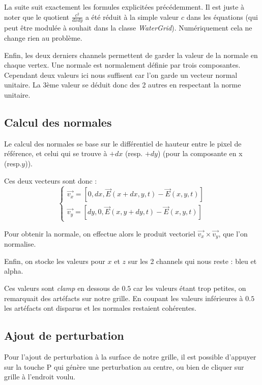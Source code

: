\documentclass[a4paper,11pt,leqno]{article}
\begin{document}
La suite suit exactement les formules explicitées précédemment. Il est juste à noter que le quotient $\frac{c^2}{dx dy}$ a été réduit à la simple valeur $c$ dans les équations (qui peut être modulée à souhait dans la classe \emph{WaterGrid}). Numériquement cela ne change rien au problème.

Enfin, les deux derniers channels permettent de garder la valeur de la normale en chaque vertex. Une normale est normalement définie par trois composantes. Cependant deux valeurs ici nous suffisent car l'on garde un vecteur normal unitaire. La 3ème valeur se déduit donc des 2 autres en respectant la norme unitaire.

\subsection{Calcul des normales}

Le calcul des normales se base sur le différentiel de hauteur entre le pixel de référence, et celui qui se trouve à $+dx$ (resp. $+dy$) (pour la composante en x (resp.$y$)).

Ces deux vecteurs sont donc :
\[
\begin{cases}
\overrightarrow{v_x} = [0, dx, \overrightarrow{E}(x + dx,y,t) - \overrightarrow{E}(x,y,t)] \\
\overrightarrow{v_y} = [dy, 0, \overrightarrow{E}(x,y + dy,t) - \overrightarrow{E}(x,y,t)]
\end{cases}
\]

Pour obtenir la normale, on effectue alors le produit vectoriel $\overrightarrow{v_x} \times \overrightarrow{v_y}$, que l'on normalise.

Enfin, on stocke les valeurs pour $x$ et $z$ sur les 2 channels qui nous reste : bleu et alpha.

Ces valeurs sont \emph{clamp} en dessous de $0.5$ car les valeurs étant trop petites, on remarquait des artéfacts sur notre grille. En coupant les valeurs inférieures à $0.5$ les artéfacts ont disparus et les normales restaient cohérentes.

\subsection{Ajout de perturbation}

Pour l'ajout de perturbation à la surface de notre grille, il est possible d'appuyer sur la touche P qui génère une perturbation au centre, ou bien de cliquer sur grille à l'endroit voulu.
\end{document}
